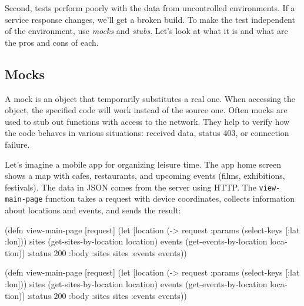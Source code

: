 Second, tests perform poorly with the data from uncontrolled environments. If a service response changes, we'll get a broken build. To make the test independent of the environment, use \emph{mocks} and \emph{stubs}. Let's look at what it is and what are the pros and cons of each.

\subsection{Mocks}

\label{test-isolation}


A mock is an object that temporarily substitutes a real one. When accessing the object, the specified code will work instead of the source one. Often mocks are used to stub out functions with access to the network. They help to verify how the code behaves in various situations: received data, status 403, or connection failure.

\label{mobile-app-intro}


Let's imagine a mobile app for organizing leisure time. The app home screen shows a map with cafes, restaurants, and upcoming events (films, exhibitions, festivals). The data in JSON comes from the server using HTTP. The \verb|view-main-page| function takes a request with device coordinates, collects information about locations and events, and sends the result:

\ifnarrow

\begin{english}
  \begin{clojure}
(defn view-main-page [request]
  (let [location
        (-> request
            :params
            (select-keys [:lat :lon]))
        sites
        (get-sites-by-location location)
        events
        (get-events-by-location
          location)]
    {:status 200
     :body {:sites sites
            :events events}}))
  \end{clojure}
\end{english}

\else

\begin{english}
  \begin{clojure}
(defn view-main-page [request]
  (let [location (-> request :params (select-keys [:lat :lon]))
        sites (get-sites-by-location location)
        events (get-events-by-location location)]
    {:status 200
     :body {:sites sites :events events}}))
  \end{clojure}
\end{english}

